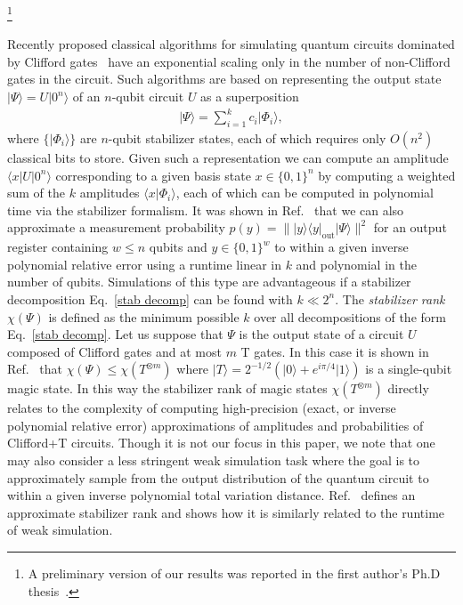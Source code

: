 \documentclass[a4paper,onecolumn,11pt,accepted=2021-11-11]{quantumarticle}
\newcommand{\ket}[1]{\ensuremath{\lvert #1 \rangle}}
\newcommand\blfootnote[1]{%
  \begingroup
  \renewcommand\thefootnote{}\footnote{#1}%
  \addtocounter{footnote}{-1}%
  \endgroup
}
\begin{document}
\maketitle
\blfootnote{A preliminary version of our results was reported in the first author's Ph.D thesis~\cite{qassim}.}

Recently proposed classical algorithms for simulating quantum circuits dominated by Clifford gates~\cite{garcia2014PhD,bravyi2016trading,bravyi2016improved,bravyi2018simulation} have an exponential scaling only in the number of non-Clifford gates in the circuit.  Such algorithms are based on representing the output state $\ket{\Psi}=U|0^n\rangle$ of an $n$-qubit circuit $U$ as a superposition
\begin{align}\label{stab decomp}
\ket{\Psi} = \sum_{i=1}^k c_i \ket{\Phi_i},
\end{align}
where $\{\ket{\Phi_i}\}$ are $n$-qubit stabilizer states, each of which requires only $O(n^2)$ classical bits to store. Given such a representation we can compute an amplitude $\langle x|U|0^n\rangle$  corresponding to a given basis state $x\in \{0,1\}^n$ by computing a weighted sum of the $k$ amplitudes $\langle x|\Phi_i\rangle$, each of which can be computed in polynomial time via the stabilizer formalism. It was shown in Ref.~\cite{bravyi2016improved} that we can also approximate a measurement probability $p(y)=\| |y\rangle\langle y|_{\mathrm{out}} |\Psi\rangle\|^2$ for an output register containing $w\leq n$ qubits and $y\in \{0,1\}^w$ to within a given inverse polynomial relative error using a runtime linear in $k$ and polynomial in the number of qubits. Simulations of this type are advantageous if a stabilizer decomposition Eq.~\eqref{stab decomp} can be found with $k \ll 2^n$. The \textit{stabilizer rank} $\chi(\Psi)$ is defined as the minimum possible $k$ over all decompositions of the form Eq.~\eqref{stab decomp}. Let us suppose that $\Psi$ is the output state of a circuit $U$  composed of Clifford gates and at most $m$ T gates.   In this case it is shown in Ref.~\cite{bravyi2016trading} that $\chi(\Psi)\leq \chi(T^{\otimes m})$ where $\ket{T} = 2^{-1/2}(\ket{0}+e^{i\pi/4} \ket{1})$ is a single-qubit magic state.  In this way the stabilizer rank of magic states $\chi(T^{\otimes m})$ directly relates to the complexity of computing high-precision (exact, or inverse polynomial relative error) approximations of amplitudes and probabilities of Clifford+T circuits.  Though it is not our focus in this paper, we note that one may also consider a less stringent weak simulation task where the goal is to approximately sample from the output distribution of the quantum circuit to within a given inverse polynomial total variation distance.  Ref.~\cite{bravyi2016improved} defines an approximate stabilizer rank and shows how it is similarly related to the runtime of weak simulation.
\end{document}
